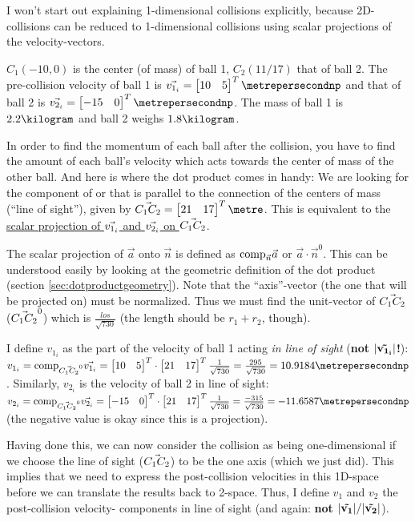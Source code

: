 \documentclass[math,plainoldenumerate,afour]{homework}
\begin{document}
I won't start out explaining 1-dimensional collisions explicitly, because
2D-collisions can be reduced to 1-dimensional collisions using scalar
projections of the velocity-vectors\cite{mcasco}.

$C_1(-10,0)$ is the center (of mass) of ball 1, $C_2(11/17)$ that of ball
2.  The pre-collision velocity of ball 1 is
$\vonei=\flatvectortwo{10}{5}\metrepersecondnp$ and that of ball 2 is
$\vtwoi=\flatvectortwo{-15}{0}\metrepersecondnp$. The mass of ball 1 is
$2.2\kilogram$ and ball 2 weighs $1.8\kilogram$.

In order to find the momentum of each ball after the collision, you have to
find the amount of each ball's velocity which acts towards the center of
mass of the other ball.  And here is where the dot product comes in handy:
We are looking for the component of \vonei or \vtwoi that is parallel to
the connection of the centers of mass (``line of sight''), given by $\los =
\flatvectortwo{21}{17}\metre$.  This is equivalent to the
\underline{scalar projection of $\vonei$ and $\vtwoi$ on $\los$}.

The scalar projection of $\vec{a}$ onto $\vec{n}$ is defined as
$\scalarprojectionof{\vec{a}}{\vec{n}}$ or $\vec{a}\cdot\vec{n}^0$. This
can be understood easily by looking at the geometric definition of the dot
product (section \ref{sec:dotproductgeometry}).  Note that the
``axis''-vector (the one that will be projected on) must be normalized.
Thus we must find the unit-vector of $\los$ ($\los^0$) which is
$\frac{los}{\sqrt{730}}$ (the length should be $r_1 + r_2$, though).

I define $v_{1_i}$ as the part of the velocity of ball 1 acting
\emph{in line of sight} (\textbf{not $\mathbf{|\vonei|}$!}): \\
$v_{1_i} = \scalarprojectionof{\vonei}{\los^0} =
\flatvectortwo{10}{5}\cdot\flatvectortwo{21}{17}\frac{1}{\sqrt{730}} =
\frac{295}{\sqrt{730}} = 10.9184\metrepersecondnp$.
Similarly, $v_{2_i}$ is the velocity of ball 2 in line of sight:
$v_{2_i} = \scalarprojectionof{\vtwoi}{\los^0} =
\flatvectortwo{-15}{0}\cdot\flatvectortwo{21}{17}\frac{1}{\sqrt{730}} =
\frac{-315}{\sqrt{730}} = -11.6587\metrepersecondnp$ (the negative
value is okay since this is a projection).

Having done this, we can now consider the collision as being
one-dimensional if we choose the line of sight ($\los$) to be the one axis
(which we just did). This implies that we need to express the
post-collision velocities in this 1D-space before we can translate the
results back to 2-space. Thus, I define $v_1$ and $v_2$ the post-collision
velocity- components in line of sight (and again: \textbf{not
  $\mathbf{|\vone|/|\vtwo|}$}).
\end{document}

